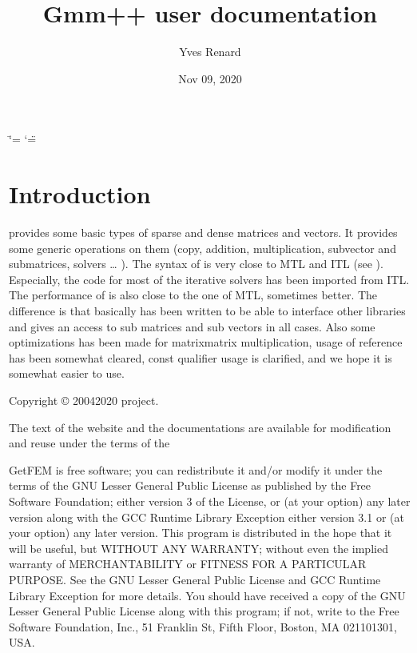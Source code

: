 \documentclass[a4paper,11pt,english]{sphinxmanual}
\title{Gmm++ user documentation}
\date{Nov 09, 2020}
\author{Yves Renard}
\begin{document}
\ifdefined\shorthandoff
  \ifnum\catcode`\=\string=\active\shorthandoff{=}\fi
  \ifnum\catcode`\"=\active{}\fi
\fi

\pagestyle{empty}
\sphinxmaketitle
\pagestyle{plain}
\sphinxtableofcontents
\pagestyle{normal}
\label{\detokenize{gmm/index::doc}}
\begin{figure}[htbp]
\centering

\noindent{}
\end{figure}




\chapter{Introduction}
\label{\detokenize{gmm/intro:introduction}}\label{\detokenize{gmm/intro:gmm-intro}}\label{\detokenize{gmm/intro::doc}}
 provides some basic types of sparse and dense matrices and vectors. It provides some generic operations on them (copy, addition, multiplication, sub\sphinxhyphen{}vector and sub\sphinxhyphen{}matrices, solvers … ). The syntax of  is very close to MTL and ITL (see ). Especially, the code for most of the iterative solvers has been imported from ITL. The performance of  is also close to the one of MTL, sometimes better. The difference is that basically  has been written to be able to interface other libraries and gives an access to sub matrices and sub vectors in all cases. Also some optimizations has been made for matrix\sphinxhyphen{}matrix multiplication, usage of reference has been somewhat cleared, const qualifier usage is clarified, and we hope it is somewhat easier to use.

Copyright © 2004\sphinxhyphen{}2020  project.

The text of the  website and the documentations are available for modification and reuse under the terms of the 

GetFEM  is  free software;  you  can  redistribute  it  and/or modify it
under  the  terms  of the  GNU  Lesser General Public License as published
by  the  Free Software Foundation;  either version 3 of the License,  or
(at your option) any later version along with the GCC Runtime Library
Exception either version 3.1 or (at your option) any later version.
This program  is  distributed  in  the  hope  that it will be useful,  but
WITHOUT ANY WARRANTY; without even the implied warranty of MERCHANTABILITY
or  FITNESS  FOR  A PARTICULAR PURPOSE.  See the GNU Lesser General Public
License and GCC Runtime Library Exception for more details.
You  should  have received a copy of the GNU Lesser General Public License
along  with  this program;  if not, write to the Free Software Foundation,
Inc., 51 Franklin St, Fifth Floor, Boston, MA  02110\sphinxhyphen{}1301, USA.
\end{document}
